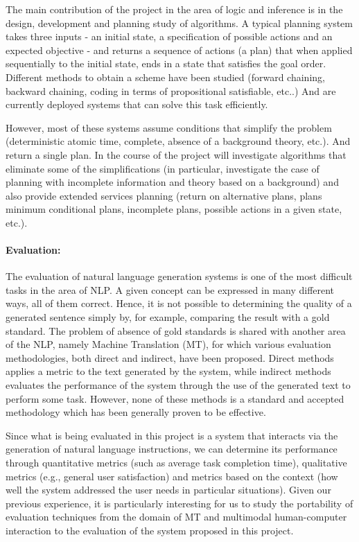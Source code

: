 The main contribution of the project in the area of logic and inference is in
the design, development and planning study of algorithms. A typical planning
system takes three inputs - an initial state, a specification of possible
actions and an expected objective - and returns a sequence of actions (a plan)
that when applied sequentially to the initial state, ends in a state that
satisfies the goal order. Different methods to obtain a scheme have been studied
(forward chaining, backward chaining, coding in terms of propositional
satisfiable, etc..) And are currently deployed systems that can solve this task
efficiently.

However, most of these systems assume conditions that simplify the problem
(deterministic atomic time, complete, absence of a background theory, etc.). And
return a single plan. In the course of the project will investigate algorithms
that eliminate some of the simplifications (in particular, investigate the case
of planning with incomplete information and theory based on a background) and
also provide extended services planning (return on alternative plans, plans
minimum conditional plans, incomplete plans, possible actions in a given state,
etc.).

\paragraph{Evaluation:} The evaluation of natural language generation systems
is one of the most difficult tasks in the area of NLP. A given concept can be 
expressed in many different ways, all of them correct. 
Hence, it is not possible to determining the quality of a
generated sentence simply by, for example, comparing 
the result with a gold standard. The problem of absence of gold standards is shared
with another area of the NLP, namely Machine Translation (MT), for which
various evaluation methodologies, both direct and indirect, have been proposed. 
Direct methods applies a metric to the text
generated by the system, while indirect methods evaluates the performance of the
system through the use of the generated text to perform some task. However, 
none of these methods is a standard and accepted methodology which has
been generally proven to be effective.

Since what is being evaluated in this project is a system that interacts via the
generation of natural language instructions, we can determine its performance
through quantitative metrics (such as average task completion time), 
qualitative metrics (e.g., general user satisfaction) and metrics based on the
context (how well the system addressed the user needs in particular situations).
Given our previous experience, it is particularly
interesting for us to study the portability of evaluation
techniques from the domain of MT
and multimodal human-computer interaction to the evaluation of the system
proposed in this project.

